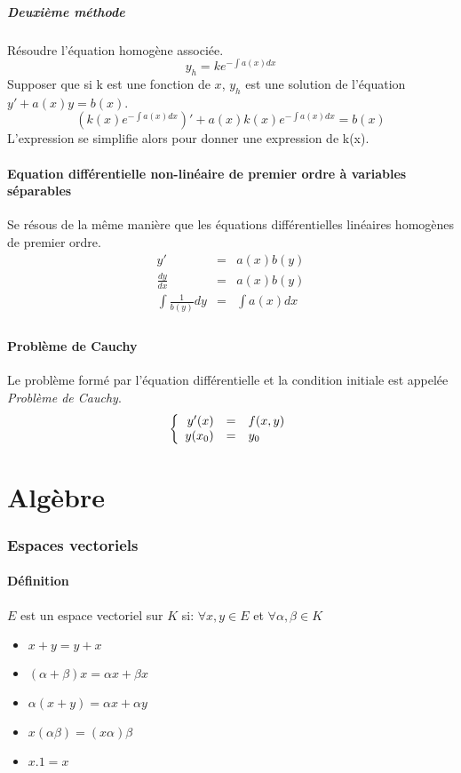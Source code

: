 \subsubsection{Deuxième méthode}
Résoudre l'équation homogène associée.
\[y_h = ke^{-\int{a(x) dx}}\]
Supposer que si k est une fonction de $x$, $y_h$ est une solution de l'équation $y' +a(x)y =b(x)$.
\[(k(x)e^{-\int{a(x) dx}})' + a(x) k(x)e^{-\int{a(x) dx}} = b(x)\]
L'expression se simplifie alors pour donner une expression de k(x).
\subsection[Non-linéaire de premier ordre à variables séparables]{Equation différentielle non-linéaire de premier ordre à variables séparables}
Se résous de la même manière que les équations différentielles linéaires homogènes de premier ordre.
\begin{eqnarray*}
y'&=& a(x)b(y)\\
\frac{dy}{dx} &=&a(x)b(y)\\
\int{ \frac{1}{b(y)} dy}&=&\int{a(x) dx}\\
\end{eqnarray*}
\subsection{Problème de Cauchy}
Le problème formé par l'équation différentielle et la condition initiale est appelée \emph{Problème de Cauchy}.\\
$$
\left\{
\begin{array}{r c l}
y'(x) &=& f(x,y)\\
y(x_0) &=& y_0
\end{array}\right.
$$

\part{Algèbre}
\section{Espaces vectoriels}
\subsection{Définition}
$E$ est un espace vectoriel sur $K$ si: $\forall x,y \in E$ et $\forall \alpha,\beta \in K$
\begin{itemize}
\item $x + y = y + x$
\item $(\alpha + \beta)x = \alpha{x} + \beta{x}$
\item $\alpha{(x + y)} = \alpha{x} + \alpha{y}$
\item $x(\alpha{\beta}) = (x\alpha{})\beta{}$
\item $x.1 = x$
\end{itemize}
